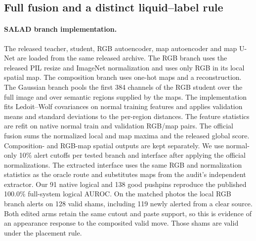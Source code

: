 \subsection{Full fusion and a distinct liquid--label rule}
\paragraph{SALAD branch implementation.}
The released teacher, student, RGB autoencoder, map autoencoder and map U-Net are loaded from the same released archive. The RGB branch uses the released PIL resize and ImageNet normalization and uses only RGB in its local spatial map. The composition branch uses one-hot maps and a reconstruction. The Gaussian branch pools the first 384 channels of the RGB student over the full image and over semantic regions supplied by the maps. The implementation fits Ledoit--Wolf covariances on normal training features and applies validation means and standard deviations to the per-region distances. The feature statistics are refit on native normal train and validation RGB/map pairs. The official fusion sums the normalized local and map maxima and the released global score. Composition- and RGB-map spatial outputs are kept separately. We use normal-only 10\% alert cutoffs per tested branch and interface after applying the official normalizations. The extracted interface uses the same RGB and normalization statistics as the oracle route and substitutes maps from the audit's independent extractor. Our 91 native logical and 138 good pushpins reproduce the published 100.0\% full-system logical AUROC. On the matched photos the local RGB branch alerts on 128 valid shams, including 119 newly alerted from a clear source. Both edited arms retain the same cutout and paste support, so this is evidence of an appearance response to the composited valid move. Those shams are valid under the placement rule.

\begin{table}[t]
\centering
\caption{\textbf{Released SALAD with all branches on the matched pushpins.} Strict normal-validation cutoffs, separately for each branch and interface. Wins give paired fault-over-sham direction with half ties. The global branch emits a scalar.}
\label{tab:fullpins}
\small

\end{table}

